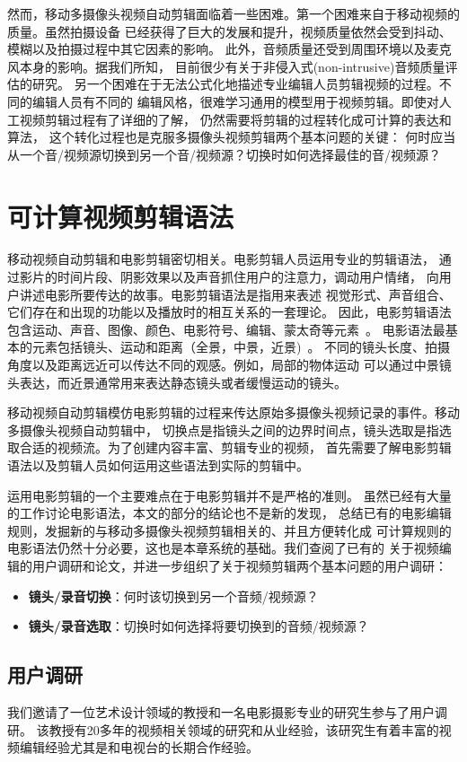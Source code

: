 \documentclass[doctor]{ustcthesis}
\begin{document}
然而，移动多摄像头视频自动剪辑面临着一些困难。第一个困难来自于移动视频的质量。虽然拍摄设备
已经获得了巨大的发展和提升，视频质量依然会受到抖动、模糊以及拍摄过程中其它因素的影响。
此外，音频质量还受到周围环境以及麦克风本身的影响。据我们所知，
目前很少有关于非侵入式(non-intrusive)音频质量评估的研究。
另一个困难在于无法公式化地描述专业编辑人员剪辑视频的过程。不同的编辑人员有不同的
编辑风格，很难学习通用的模型用于视频剪辑。即使对人工视频剪辑过程有了详细的了解，
仍然需要将剪辑的过程转化成可计算的表达和算法，
这个转化过程也是克服多摄像头视频剪辑两个基本问题的关键：
何时应当从一个音/视频源切换到另一个音/视频源？切换时如何选择最佳的音/视频源？

\section{可计算视频剪辑语法}
移动视频自动剪辑和电影剪辑密切相关。电影剪辑人员运用专业的剪辑语法，
通过影片的时间片段、阴影效果以及声音抓住用户的注意力，调动用户情绪，
向用户讲述电影所要传达的故事。电影剪辑语法是指用来表述
视觉形式、声音组合、它们存在和出现的功能以及播放时的相互关系的一套理论。
因此，电影剪辑语法包含运动、声音、图像、颜色、电影符号、编辑、蒙太奇等元素~\cite{manchel1990film}。
电影语法最基本的元素包括镜头、运动和距离（全景，中景，近景)~\cite{CinemaElements1982}。
不同的镜头长度、拍摄角度以及距离远近可以传达不同的观感。例如，局部的物体运动
可以通过中景镜头表达，而近景通常用来表达静态镜头或者缓慢运动的镜头。

移动视频自动剪辑模仿电影剪辑的过程来传达原始多摄像头视频记录的事件。移动多摄像头视频自动剪辑中，
切换点是指镜头之间的边界时间点，镜头选取是指选取合适的视频流。为了创建内容丰富、剪辑专业的视频，
首先需要了解电影剪辑语法以及剪辑人员如何运用这些语法到实际的剪辑中。

运用电影剪辑的一个主要难点在于电影剪辑并不是严格的准则。
虽然已经有大量的工作讨论电影语法，本文的部分的结论也不是新的发现，
总结已有的电影编辑规则，发掘新的与移动多摄像头视频剪辑相关的、并且方便转化成
可计算规则的电影语法仍然十分必要，这也是本章系统的基础。我们查阅了已有的
关于视频编辑的用户调研和论文，并进一步组织了关于视频剪辑两个基本问题的用户调研：
\begin{itemize}\setlength{\itemsep}{0pt}
    \item \textbf{镜头/录音切换}：何时该切换到另一个音频/视频源？
    \item \textbf{镜头/录音选取}：切换时如何选择将要切换到的音频/视频源？
\end{itemize}

\subsection{用户调研}
我们邀请了一位艺术设计领域的教授和一名电影摄影专业的研究生参与了用户调研。
该教授有20多年的视频相关领域的研究和从业经验，该研究生有着丰富的视频编辑经验尤其是和电视台的长期合作经验。
\end{document}
